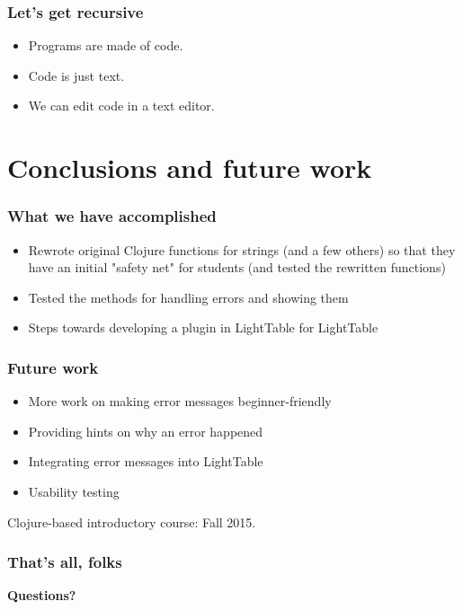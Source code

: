 \documentclass{beamer}
\newcommand{\comment}[1]{{\bf \tt  {#1}}}
\newcommand{\emcomment}[1]{\textcolor{ForestGreen}{\comment{Elena: {#1}}}}
\begin{document}
\begin{frame}
\frametitle{Let's get recursive}
	\begin{itemize}
	\item Programs are made of code.
	\item Code is just text.
	\item We can edit code in a text editor.
	\end{itemize}
\end{frame} 

\section{Conclusions and future work}

\begin{frame}[fragile]
\frametitle{What we have accomplished}
\begin{itemize}
\item Rewrote original Clojure functions for strings (and a few others) so that they have an initial "safety net" for students (and tested the rewritten functions)
\item Tested the methods for handling errors and showing them 
\item Steps towards developing a plugin in LightTable for LightTable
\end{itemize}
\end{frame}

\begin{frame}[fragile]
\frametitle{Future work}
\begin{itemize}
\item More work on making error messages beginner-friendly
\item Providing hints on why an error happened
\item Integrating error messages into LightTable
\item Usability testing
\end{itemize}
Clojure-based introductory course: Fall 2015. 
\end{frame}

\begin{frame}[fragile]
\frametitle{That's all, folks}
{\bf\large Questions?}
\end{frame}
\end{document}
